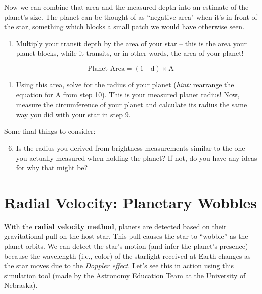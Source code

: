 \documentclass[12pt]{article}
\begin{document}
\medskip \noindent
Now we can combine that area and the measured depth into an estimate of the planet's size. The planet can be thought of as ``negative area" when it's in front of the star, something which blocks a small patch we would have otherwise seen. 
\begin{enumerate}[label=\textbf{Step \arabic*:},resume]
    \item Multiply your transit depth by the area of your star -- this is the area your planet blocks, while it transits, or in other words, the area of your planet!
\end{enumerate}
    $$\textrm{Planet Area} = (\text{1 - d}) \times \text{A}$$
\begin{enumerate}[label=\textbf{Step \arabic*:},resume]
    \item Using this area, solve for the radius of your planet (\textit{hint: }rearrange the equation for A from step 10). This is your measured planet radius! Now, measure the circumference of your planet and calculate its radius the same way you did with your star in step 9.

\end{enumerate}

\medskip \noindent
Some final things to consider:
\begin{enumerate}
\setcounter{enumi}{5}
    \item Is the radius you derived from brightness measurements similar to the one you actually measured when holding the planet? If not, do you have any ideas for why that might be?
    
\end{enumerate}
\section{Radial Velocity: Planetary Wobbles}

With the \textbf{radial velocity method}, planets are detected based on their gravitational pull on the host star. This pull causes the star to ``wobble'' as the planet orbits. We can detect the star's motion (and infer the planet's presence) because the wavelength (i.e., color) of the starlight received at Earth changes as the star moves due to the \textit{Doppler effect}. Let's see this in action using \href{https://astro.unl.edu/naap/esp/animations/radialVelocitySimulator.html}{this simulation tool} (made by the Astronomy Education Team at the University of Nebraska).
\end{document}
